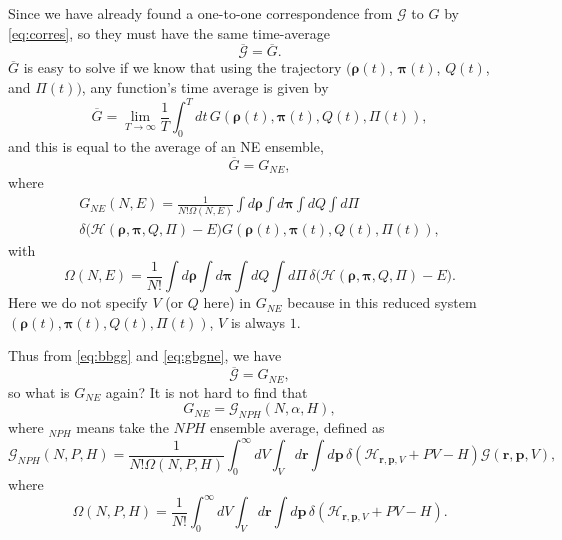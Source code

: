Since we have already found a one-to-one correspondence
from $\mathscr{G}$ to $G$ by
\eqref{eq:corres}, so they must have the same time-average
\begin{equation}\label{eq:bbgg}
	\overline{\mathscr{G}} = \overline{G}.
\end{equation}
$\overline{G}$ is easy to solve if we know
that using the trajectory
$(\bm{\rho}(t)$, $\bm{\pi}(t)$, $Q(t)$, and $\Pi(t))$,
any function's time average is given by
\begin{equation}
	\overline{G} = \lim_{T \rightarrow \infty} \frac{ 1 }{ T } \int_{0}^{T}  dt \,
	G(\bm{\rho}(t), \bm{\pi}(t), Q(t), \Pi(t)),
\end{equation}
and this is equal to the average of an NE ensemble,
\begin{equation}\label{eq:gbgne}
	\overline{G} = G_{NE},
\end{equation}
where
\begin{multline}
	G_{NE} (N, E) = \frac{ 1 }{ N! \Omega(N,E) } \int d\bm{\rho} \int d\bm{\pi}
	\int dQ \int d\Pi \\
	\delta \big( \mathcal{H}(\bm{\rho}, \bm{\pi}, Q, \Pi)
	- E \big) G(\bm{\rho}(t), \bm{\pi}(t), Q(t), \Pi(t)),
\end{multline}
with
\begin{equation}
	\Omega(N, E) = \frac{ 1 }{ N! }  \int d\bm{\rho} \int d\bm{\pi}
	\int dQ \int d\Pi \, \delta \big( \mathcal{H}(\bm{\rho}, \bm{\pi}, Q, \Pi)
	- E \big).
\end{equation}
Here we do not specify $V$ (or $Q$ here) in $G_{NE}$ because in this reduced system
$(\bm{\rho}(t), \bm{\pi}(t), Q(t), \Pi(t))$, $V$ is always $1$.

Thus from \eqref{eq:bbgg} and \eqref{eq:gbgne}, we have
\begin{equation}\label{eq:ggne}
	\overline{\mathscr{G}} = G_{NE},
\end{equation}
so what is $G_{NE}$ again?
It is not hard to find that
\begin{equation}\label{eq:gnegnph}
	G_{NE} = \mathscr{G}_{NPH}(N, \alpha, H),
\end{equation}
where $_{NPH}$ means take the $NPH$ ensemble average, defined as
\begin{equation}
	\mathscr{G}_{NPH} (N, P, H) = \frac{ 1 }{ N!\Omega(N, P, H) }
	\int_{0}^{\infty} dV \int_{V} d\bm{r} \int d\bm{p}\,
	\delta(\mathcal{H}_{\bm{r}, \bm{p}, V} + P V - H)
	\mathscr{G}(\bm{r}, \bm{p}, V),
\end{equation}
where
\begin{equation}
	\Omega (N, P, H) = \frac{ 1 }{ N! }
	\int_{0}^{\infty} dV \int_{V} d\bm{r} \int d\bm{p}\,
	\delta(\mathcal{H}_{\bm{r}, \bm{p}, V} + P V - H) .
\end{equation}

